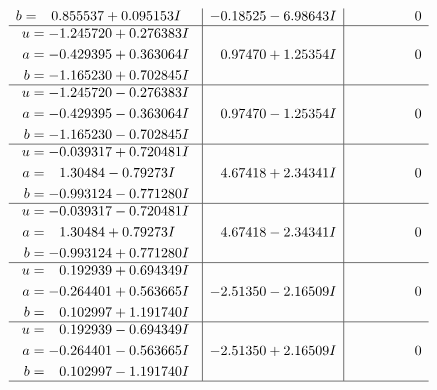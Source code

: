 \documentclass[1p]{elsarticle_modified}
\theoremstyle{definition}
\begin{document}
$$\begin{array}{c|c|c}
\begin{aligned}
b &= \phantom{-}0.855537 + 0.095153 I\end{aligned}
 & -0.18525 - 6.98643 I & \phantom{-0.000000 } 0 \\ \hline\begin{aligned}
u &= -1.245720 + 0.276383 I \\
a &= -0.429395 + 0.363064 I \\
b &= -1.165230 + 0.702845 I\end{aligned}
 & \phantom{-}0.97470 + 1.25354 I & \phantom{-0.000000 } 0 \\ \hline\begin{aligned}
u &= -1.245720 - 0.276383 I \\
a &= -0.429395 - 0.363064 I \\
b &= -1.165230 - 0.702845 I\end{aligned}
 & \phantom{-}0.97470 - 1.25354 I & \phantom{-0.000000 } 0 \\ \hline\begin{aligned}
u &= -0.039317 + 0.720481 I \\
a &= \phantom{-}1.30484 - 0.79273 I \\
b &= -0.993124 - 0.771280 I\end{aligned}
 & \phantom{-}4.67418 + 2.34341 I & \phantom{-0.000000 } 0 \\ \hline\begin{aligned}
u &= -0.039317 - 0.720481 I \\
a &= \phantom{-}1.30484 + 0.79273 I \\
b &= -0.993124 + 0.771280 I\end{aligned}
 & \phantom{-}4.67418 - 2.34341 I & \phantom{-0.000000 } 0 \\ \hline\begin{aligned}
u &= \phantom{-}0.192939 + 0.694349 I \\
a &= -0.264401 + 0.563665 I \\
b &= \phantom{-}0.102997 + 1.191740 I\end{aligned}
 & -2.51350 - 2.16509 I & \phantom{-0.000000 } 0 \\ \hline\begin{aligned}
u &= \phantom{-}0.192939 - 0.694349 I \\
a &= -0.264401 - 0.563665 I \\
b &= \phantom{-}0.102997 - 1.191740 I\end{aligned}
 & -2.51350 + 2.16509 I & \phantom{-0.000000 } 0\\
 \hline 
 \end{array}$$\newpage$$\begin{array}{c|c|c}  

\end{array}$$
\end{document}
